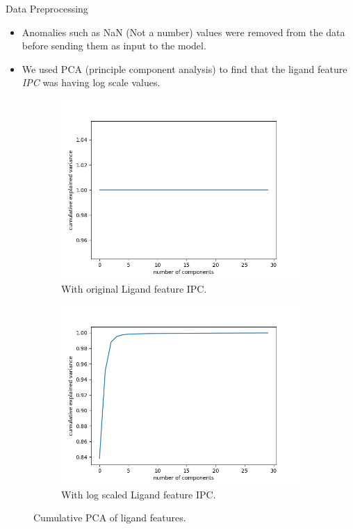\documentclass{beamer}
\begin{document}
\begin{frame}[t]{Data Preprocessing}
\begin{itemize}
\item Anomalies such as NaN (Not a number) values were removed from the data before sending them as input to the model.
\item We used PCA (principle component analysis) to find that the ligand feature \textit{IPC} was having log scale values.
\end{itemize}

\begin{figure}
     \centering
     \begin{subfigure}[b]{0.4\textwidth}
         \centering
    \includegraphics[scale=0.25]{images/pcaligandanalysisIPC}
    \caption{With original Ligand feature IPC.}
    \label{fig:pcaproteinanalysisIPC}
     \end{subfigure}
     \hfill
     \begin{subfigure}[b]{0.4\textwidth}
         \centering
        \includegraphics[scale=0.25]{images/pcawithscaledIPC}
        \caption{With log scaled Ligand feature IPC.}
        \label{fig:pcawithscaledIPC}
     \end{subfigure}
     \caption{Cumulative PCA of ligand features.}
     \label{fig:PCAAnalysis}
\end{figure}

\end{frame}
\end{document}
